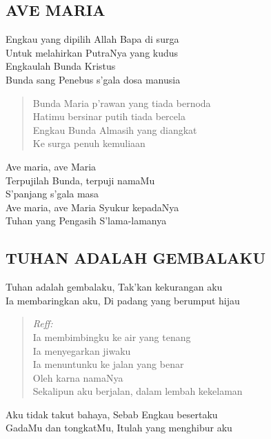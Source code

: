 
\subsection{ AVE MARIA}
\begin{altverse}
Engkau yang dipilih Allah Bapa di surga\\
Untuk melahirkan PutraNya yang kudus\\
Engkaulah Bunda Kristus\\
Bunda sang Penebus s’gala dosa manusia
\end{altverse}

\begin{verse}
Bunda Maria p’rawan yang tiada bernoda\\
Hatimu bersinar putih tiada bercela\\
Engkau Bunda Almasih yang diangkat\\
Ke surga penuh kemuliaan
\end{verse}

\begin{altverse}
Ave maria, ave Maria\\
Terpujilah Bunda, terpuji namaMu\\
S’panjang s’gala masa\\
Ave maria, ave Maria Syukur kepadaNya\\
Tuhan yang Pengasih S’lama-lamanya
\end{altverse}

\subsection{ TUHAN ADALAH GEMBALAKU}
\begin{altverse}
Tuhan adalah gembalaku, Tak’kan kekurangan aku\\
Ia membaringkan aku, Di padang yang berumput hijau
\end{altverse}

\begin{verse}
\textit{Reff:}\\
Ia membimbingku ke air yang tenang\\
Ia menyegarkan jiwaku\\
Ia menuntunku ke jalan yang benar\\
Oleh karna namaNya\\
Sekalipun aku berjalan, dalam lembah kekelaman
\end{verse}

\begin{altverse}
Aku tidak takut bahaya, Sebab Engkau besertaku\\
GadaMu dan tongkatMu, Itulah yang menghibur aku
\end{altverse}

